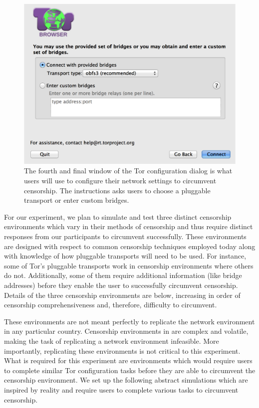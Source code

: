\documentclass[letterpaper,twocolumn,11pt]{article}
\begin{document}
\begin{figure}[t]
\includegraphics[width=\linewidth]{configuration-dialog.png}
\caption{The fourth and final window of the Tor configuration dialog is what users will use to 
configure their network settings to circumvent censorship. The instructions asks users to 
choose a pluggable transport or enter custom bridges.}
\label{dialog}
\end{figure}

\indent \indent For our experiment, we plan to simulate and test three distinct censorship environments
which vary in their methods of censorship and thus require distinct responses from our 
participants to circumvent successfully. These environments are designed with respect to 
common censorship techniques employed 
today along with knowledge of how pluggable transports will need to be used.
For instance, some of Tor's pluggable transports work in censorship environments
where others do not. Additionally, some of them require additional information (like bridge 
addresses) before they enable the user to successfully circumvent censorship. 
Details of the three censorship environments are below, increasing in 
order of censorship comprehensiveness and, therefore, difficulty to circumvent. 

These environments are not meant perfectly to replicate the network environment
in any particular country.  Censorship environments in are complex and volatile, making
the task of replicating a network environment infeasible. More importantly, replicating these
environments is not critical to this experiment. What is required for this experiment are 
environments which would require users to complete similar Tor configuration 
tasks before they are able to circumvent the censorship environment. We set up the following 
abstract simulations which are inspired by reality and require users to complete various tasks
to circumvent censorship. 
\end{document}
